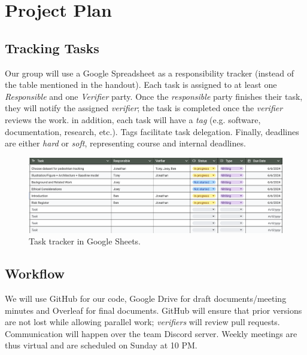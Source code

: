 \documentclass{article} %
\begin{document}
\section{Project Plan}
\subsection{Tracking Tasks}
Our group will use a Google Spreadsheet as a responsibility tracker (instead of the table mentioned in the handout). Each task is assigned to at least one \textit{Responsible} and one \textit{Verifier} party. Once the \textit{responsible} party finishes their task, they will notify the assigned \textit{verifier}; the task is completed once the \textit{verifier} reviews the work. in addition, each task will have a \textit{tag} (e.g. software, documentation, research, etc.). Tags facilitate task delegation. Finally, deadlines are either \textit{hard} or \textit{soft}, representing course and internal deadlines.
\begin{figure}[h]
    \centering
    \includegraphics[width=0.75\linewidth]{Figs/task_tracker.png}
    \caption{Task tracker in Google Sheets.}
    \label{fig:task}
\end{figure}
\subsection{Workflow}
We will use GitHub for our code, Google Drive for draft documents/meeting minutes and Overleaf for final documents. GitHub will ensure that prior versions are not lost while allowing parallel work; \textit{verifiers} will review pull requests. Communication will happen over the team Discord server. Weekly meetings are thus virtual and are scheduled on Sunday at 10 PM. 
\end{document}
